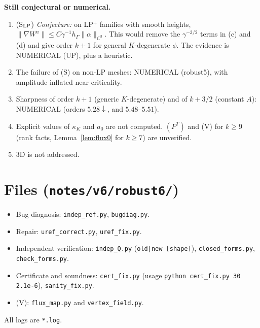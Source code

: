 \documentclass[11pt]{article}
\theoremstyle{remark}
\newcommand{\hG}{h_\Gamma}
\begin{document}
\noindent\textbf{Still conjectural or numerical.}
\begin{enumerate}
\item (S$_{\rm LP}$) \emph{Conjecture:} on LP$^+$ families with smooth heights, $\|\nabla W^a\|\le C\gamma^{-1}\hG\|\alpha\|_{C^3}$. This would
remove the $\gamma^{-3/2}$ terms in (c) and (d) and give order $k+1$ for general $K$-degenerate $\phi$. The evidence is NUMERICAL (\textsf{UP}), plus a heuristic.
\item The failure of (S) on non-LP meshes: NUMERICAL (robust5), with amplitude inflated near criticality.
\item Sharpness of order $k+1$ (generic $K$-degenerate) and of $k+3/2$ (constant $A$): NUMERICAL (orders $5.28\downarrow$, and $5.48$--$5.51$).
\item Explicit values of $\kappa_K$ and $a_0$ are not computed. $(P^T)$ and (V) for $k\ge9$ (rank facts, Lemma~\ref{lem:flux0} for $k\ge7$) are unverified.
\item 3D is not addressed.
\end{enumerate}

\section*{Files (\texttt{notes/v6/robust6/})}
\begin{itemize}
\item Bug diagnosis: \texttt{indep\_ref.py}, \texttt{bugdiag.py}.
\item Repair: \texttt{uref\_correct.py}, \texttt{uref\_fix.py}.
\item Independent verification: \texttt{indep\_Q.py} (\texttt{old|new [shape]}), \texttt{closed\_forms.py}, \texttt{check\_forms.py}.
\item Certificate and soundness: \texttt{cert\_fix.py} (usage \texttt{python cert\_fix.py 30 2.1e-6}), \texttt{sanity\_fix.py}.
\item (V): \texttt{flux\_map.py} and \texttt{vertex\_field.py}.
\end{itemize}
All logs are \texttt{*.log}.
\end{document}
